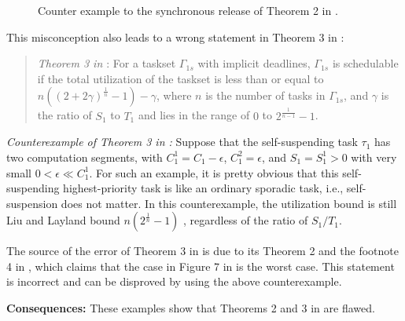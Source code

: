 \begin{figure}[t]
{}     
  \caption{Counter example to the synchronous release of Theorem 2 in \cite{RTSS-KimANR13}.}
  \label{fig:counterexample-reduce-interf}
\end{figure}

This misconception also leads to a wrong statement in Theorem 3 in \cite{RTSS-KimANR13}:
\begin{quote}
{\it Theorem 3 in \cite{RTSS-KimANR13}}: For a taskset $\Gamma_{1s}$ with implicit deadlines, $\Gamma_{1s}$ is schedulable if the total utilization of the taskset is less than or equal to $n((2+2\gamma)^{\frac{1}{n}}-1)-\gamma$, where $n$ is the number of tasks in $\Gamma_{1s}$, and $\gamma$ is the ratio of
$S_1$ to $T_1$ and lies in the range of $0$ to $2^{\frac{1}{n-1}}-1$. 
\end{quote}


{\it Counterexample of Theorem 3 in \cite{RTSS-KimANR13}:} Suppose that the self-suspending task $\tau_1$ has two computation segments, with $C_1^1 = C_1-\epsilon$, $C_1^2 = \epsilon$, and $S_1=S_1^1 > 0$ with very small $0 < \epsilon \ll C_1^1$. For such an example, it is pretty obvious that this self-suspending highest-priority task is like an ordinary sporadic task, i.e., self-suspension does not matter. 
 In this counterexample, the utilization bound is still Liu and Layland bound $n(2^{\frac{1}{n}}-1)$ \cite{Liu_1973}, regardless of the ratio of $S_1/T_1$. 

The source of the error of Theorem 3 in \cite{RTSS-KimANR13} is due to its Theorem 2 and the footnote 4 in \cite{RTSS-KimANR13}, which claims that the case in Figure 7 in \cite{RTSS-KimANR13} is the worst case. This statement is incorrect and can be disproved by using the above counterexample. 


{\bf Consequences:} These examples show that Theorems 2 and 3 in \cite{RTSS-KimANR13} are flawed.  

